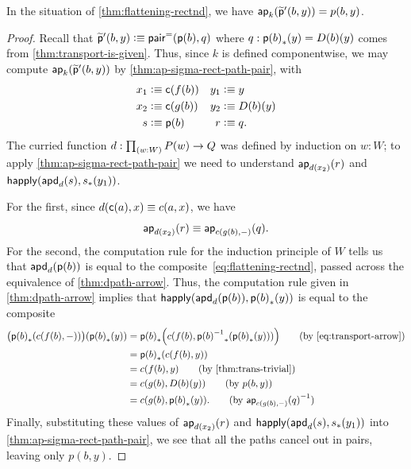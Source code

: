 \begin{lem}\label{thm:flattening-rectnd-beta-ppt}
  In the situation of \cref{thm:flattening-rectnd}, we have $\mathsf{ap}_{k}(\widetilde{\mathsf{p}}'(b,y)) = p(b,y)$.
\end{lem}
\begin{proof}
  Recall that $\widetilde{\mathsf{p}}'(b,y) \vcentcolon\equiv \mathsf{pair}^{\mathord{=}}(\mathsf{p}(b),q)$ where $q:{\mathsf{p}(b)}_{*}\mathopen{}\left({y}\right)\mathclose{} = D(b)(y)$ comes from \cref{thm:transport-is-given}.
  Thus, since $k$ is defined componentwise, we may compute $\mathsf{ap}_{k}(\widetilde{\mathsf{p}}'(b,y))$ by \cref{thm:ap-sigma-rect-path-pair}, with
  \begin{align*}
    x_1 &\vcentcolon\equiv \mathsf{c}(f(b)) & y_1 &\vcentcolon\equiv y\\
    x_2 &\vcentcolon\equiv \mathsf{c}(g(b)) & y_2 &\vcentcolon\equiv D(b)(y)\\
    s &\vcentcolon\equiv \mathsf{p}(b)      &   r &\vcentcolon\equiv q.
  \end{align*}
  The curried function $d:\prd{w:W} P(w) \to Q$ was defined by induction on $w:W$;
  to apply \cref{thm:ap-sigma-rect-path-pair} we need to understand $\mathsf{ap}_{d(x_2)}(r)$ and $\mathsf{happly}(\mathsf{apd}_{d}(s),{s}_{*}\mathopen{}\left({y_1}\right)\mathclose{})$.

  For the first, since $d(\mathsf{c}(a),x)\equiv c(a,x)$, we have
  \[ \mathsf{ap}_{d(x_2)}(r) \equiv \mathsf{ap}_{c(g(b),-)}(q). \]
  For the second, the computation rule for the induction principle of $W$ tells us that $\mathsf{apd}_{d}(\mathsf{p}(b))$ is equal to the composite~\eqref{eq:flattening-rectnd}, passed across the equivalence of \cref{thm:dpath-arrow}.
  Thus, the computation rule given in \cref{thm:dpath-arrow} implies that $\mathsf{happly}(\mathsf{apd}_{d}(\mathsf{p}(b)),{\mathsf{p}(b)}_{*}\mathopen{}\left({y}\right)\mathclose{})$ is equal to the composite
  \begin{align}
    \big(\trans{\pp(b)}{c(f(b),-)}\big)(\trans {\pp(b)}{y})
    &= \trans{\pp(b)}{c(f(b),\trans{\opp {\pp(b)}}{\trans {\pp(b)}{y}})}
    \tag{by~\eqref{eq:transport-arrow}}\\
    &= \trans{\pp(b)}{c(f(b),y)}
    \notag \\
    &= c(f(b),y)
    \tag{by \cref{thm:trans-trivial}}\\
    &= c(g(b),D(b)(y))
   \tag{by $p(b,y)$}\\
    &= c(g(b),\trans{\pp(b)}{y}).
    \tag{by $\opp{\apfunc{c(g(b),-)}(q)}$}
  \end{align}
  Finally, substituting these values of $\mathsf{ap}_{d(x_2)}(r)$ and $\mathsf{happly}(\mathsf{apd}_{d}(s),{s}_{*}\mathopen{}\left({y_1}\right)\mathclose{})$ into \cref{thm:ap-sigma-rect-path-pair}, we see that all the paths cancel out in pairs, leaving only $p(b,y)$.
\end{proof}

